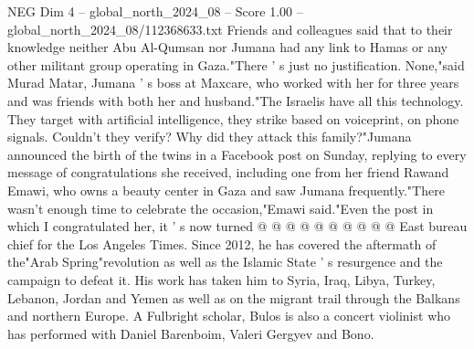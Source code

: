 \begin{textsample}{NEG Dim 4 – global\_north\_2024\_08 – Score 1.00 – global\_north\_2024\_08/112368633.txt}
Friends and colleagues said that to their knowledge neither Abu Al-Qumsan nor Jumana had any link to Hamas or any other militant group operating in Gaza."There ' s just no justification.
None,"said Murad Matar, Jumana ' s boss at Maxcare, who worked with her for three years and was friends with both her and husband."The Israelis have all this technology.
They target with artificial intelligence, they strike based on voiceprint, on phone signals.
Couldn't they verify?
Why did they attack this family?"Jumana announced the birth of the twins in a Facebook post on Sunday, replying to every message of congratulations she received, including one from her friend Rawand Emawi, who owns a beauty center in Gaza and saw Jumana frequently."There wasn't enough time to celebrate the occasion,"Emawi said."Even the post in which I congratulated her, it ' s now turned @ @ @ @ @ @ @ @ @ @ East bureau chief for the Los Angeles Times.
Since 2012, he has covered the aftermath of the"Arab Spring"revolution as well as the Islamic State ' s resurgence and the campaign to defeat it.
His work has taken him to Syria, Iraq, Libya, Turkey, Lebanon, Jordan and Yemen as well as on the migrant trail through the Balkans and northern Europe.
A Fulbright scholar, Bulos is also a concert violinist who has performed with Daniel Barenboim, Valeri Gergyev and Bono.

\end{textsample}
